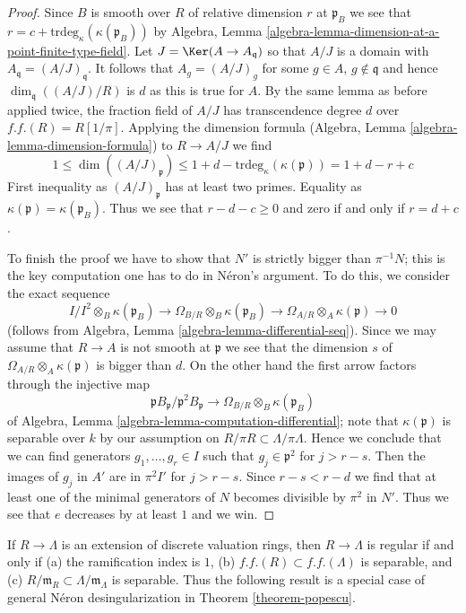 \begin{proof}
\medskip\noindent
Since $B$ is smooth over $R$ of relative dimension $r$ at $\mathfrak p_B$
we see that $r = c + \text{trdeg}_\kappa(\kappa(\mathfrak p_B))$ by
Algebra, Lemma \ref{algebra-lemma-dimension-at-a-point-finite-type-field}.
Let $J = \Ker(A \to A_\mathfrak q)$ so that $A/J$ is a domain
with $A_\mathfrak q = (A/J)_\mathfrak q$. It follows that
$A_g = (A/J)_g$ for some $g \in A$, $g \not \in \mathfrak q$
and hence $\dim_\mathfrak q((A/J)/R)$ is $d$ as this is true for $A$.
By the same lemma as before applied twice, the fraction field of $A/J$
has transcendence degree $d$ over $f.f.(R) = R[1/\pi]$.
Applying the dimension formula
(Algebra, Lemma \ref{algebra-lemma-dimension-formula})
to $R \to A/J$ we find
$$
1 \leq \dim((A/J)_\mathfrak p) \leq 1 + d -
\text{trdeg}_\kappa(\kappa(\mathfrak p)) = 1 + d - r + c
$$
First inequality as $(A/J)_\mathfrak p$ has at least two primes.
Equality as $\kappa(\mathfrak p) = \kappa(\mathfrak p_B)$.
Thus we see that $r - d - c \geq 0$ and zero if and only if $r = d + c$.

\medskip\noindent
To finish the proof we have to show that $N'$ is strictly bigger
than $\pi^{-1}N$; this is the key computation one has to do
in N\'eron's argument. To do this, we consider the exact sequence
$$
I/I^2 \otimes_B \kappa(\mathfrak p_B)
\to \Omega_{B/R} \otimes_B \kappa(\mathfrak p_B)
\to \Omega_{A/R} \otimes_A \kappa(\mathfrak p) \to 0
$$
(follows from Algebra, Lemma \ref{algebra-lemma-differential-seq}).
Since we may assume that $R \to A$ is not
smooth at $\mathfrak p$ we see that the dimension $s$ of
$\Omega_{A/R} \otimes_A \kappa(\mathfrak p)$
is bigger than $d$. On the other hand
the first arrow factors through the injective map
$$
\mathfrak p B_\mathfrak p/\mathfrak p^2 B_\mathfrak p
\to \Omega_{B/R} \otimes_B \kappa(\mathfrak p_B)
$$
of Algebra, Lemma \ref{algebra-lemma-computation-differential};
note that $\kappa(\mathfrak p)$ is separable over $k$
by our assumption on $R/\pi R \subset \Lambda/\pi \Lambda$.
Hence we conclude that we can find generators
$g_1, \ldots, g_r \in I$ such that $g_j \in \mathfrak p^2$
for $j > r - s$. Then the images of $g_j$ in $A'$ are in $\pi^2 I'$
for $j > r - s$. Since $r - s < r - d$
we find that at least one of the minimal generators
of $N$ becomes divisible by $\pi^2$ in $N'$.
Thus we see that $e$ decreases by at least $1$ and we win.
\end{proof}

\noindent
If $R \to \Lambda$ is an extension of discrete valuation rings,
then $R \to \Lambda$ is regular if and only if
(a) the ramification index is $1$,
(b) $f.f.(R) \subset f.f.(\Lambda)$ is separable, and
(c) $R/\mathfrak m_R \subset \Lambda/\mathfrak m_\Lambda$
is separable. Thus the following result is a special case
of general N\'eron desingularization in
Theorem \ref{theorem-popescu}.

